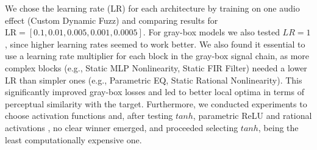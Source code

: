 We chose the learning rate (LR) for each architecture by training on one audio effect (Custom Dynamic Fuzz) and comparing results for $\text{LR}=[0.1,0.01,0.005,0.001,0.0005]$.
For gray-box models we also tested $LR=1$, since higher learning rates seemed to work better. 
We also found it essential to use a learning rate multiplier for each block in the gray-box signal chain, as more complex blocks (e.g., Static MLP Nonlinearity, Static FIR Filter) needed a lower LR than simpler ones (e.g., Parametric EQ, Static Rational Nonlinearity).
This significantly improved gray-box losses and led to better local optima in terms of perceptual similarity with the target.
Furthermore, we conducted experiments to choose activation functions and, after testing $tanh$, parametric ReLU and rational activations \citep{delfosse2020rationals}, no clear winner emerged, and proceeded selecting $tanh$, being the least computationally expensive one.

